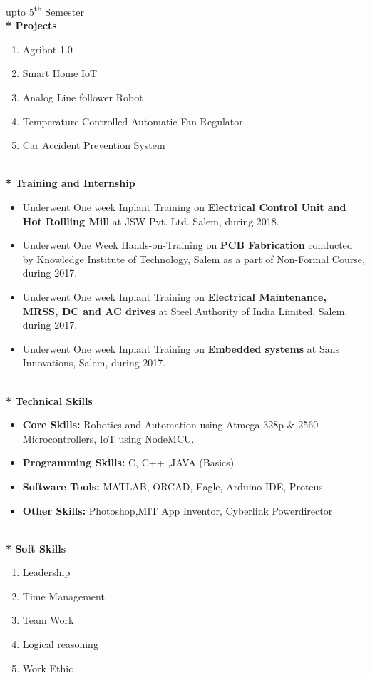 \documentclass{article}
\begin{document}
\hspace{422pt} \footnotesize *upto 5\textsuperscript{th} Semester
\large
\textbf{\\* Projects}
\begin{enumerate}
\item Agribot 1.0
\item Smart Home IoT
\item Analog Line follower Robot
\item Temperature Controlled Automatic Fan Regulator
\item Car Accident Prevention System
\end{enumerate}
\begin{flushleft}
\textbf{\\* Training and Internship}
\begin{itemize}
\item Underwent One week Inplant Training on \textbf{Electrical Control Unit and Hot Rollling Mill} at JSW Pvt. Ltd. Salem, during 2018.
\item  Underwent One Week Hands-on-Training on \textbf{PCB Fabrication} conducted by Knowledge Institute of Technology, Salem as a part of Non-Formal Course, during 2017.
\item Underwent One week Inplant Training on \textbf{Electrical Maintenance, MRSS, DC and AC drives} at Steel Authority of India Limited, Salem, during 2017.
\item Underwent One week Inplant Training on\textbf{ Embedded systems} at Sans Innovations, Salem, during 2017.
\end{itemize}


\textbf{\\* Technical Skills}
\begin{itemize}
\item \textbf{Core Skills:} Robotics and Automation using Atmega 328p \& 2560 Microcontrollers, IoT using NodeMCU.
\item \textbf{Programming Skills:} C, C++ ,JAVA (Basics) 
\item \textbf{Software Tools:} MATLAB, ORCAD, Eagle, Arduino IDE, Proteus
\item \textbf{Other Skills:} Photoshop,MIT App Inventor, Cyberlink Powerdirector
\end{itemize}

\textbf{\\* Soft Skills}
\begin{enumerate}
\item Leadership
\item Time Management
\item Team Work
\item Logical reasoning
\item Work Ethic
\end{enumerate}


\end{flushleft}
\end{document}
